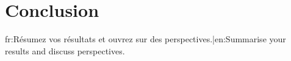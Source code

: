 \chapter{Conclusion}
\label{ch:conclusion}

{{fr:Résumez vos résultats et ouvrez sur des perspectives.|en:Summarise your results and discuss perspectives.}}
